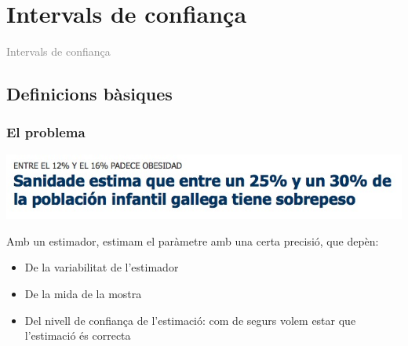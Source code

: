 \documentclass[12pt,t]{beamer}
\title[\red{Matemàtiques III}]{}
\author[]{}
\date{}
\newcommand{\gray}[1]{\textcolor{gray}{#1}}
\renewcommand{\emph}[1]{{\color{red}#1}}
\theoremstyle{plain}
\theoremstyle{definition}
\begin{document}
\beamertemplatedotitem

\lstset{breaklines=true}
\lstset{basicstyle=\ttfamily}


\section{Intervals de confiança}

\begin{frame}
\vfill
\begin{center}
\gray{\LARGE Intervals de confiança}
\end{center}
\vfill
\end{frame}

\subsection{Definicions bàsiques}

\begin{frame}
\frametitle{El problema}
\vspace*{-1cm}

\begin{center}
\hspace*{-0.6cm}
\includegraphics[width=1.1\linewidth]{sanidade}
\end{center}
\vspace*{-1ex}

Amb un estimador, estimam el paràmetre amb una certa precisió, que depèn:
\medskip

\begin{itemize}
\item De la variabilitat de l'estimador
\medskip

\item De la mida de la mostra
\medskip

\item Del \emph{nivell de confiança} de l'estimació: com de segurs volem estar que l'estimació és correcta
\end{itemize}
\end{frame}
\end{document}
